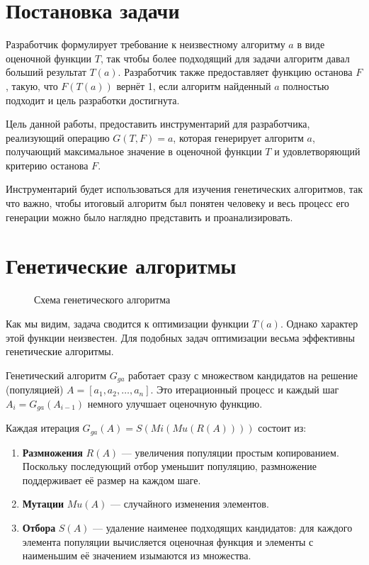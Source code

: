 \documentclass[utf8,a5paper,portrait,10pt,twoside]{eskdtext}
\begin{document}
\newpage
\section{Постановка задачи}
Разработчик формулирует требование к неизвестному алгоритму $a$ в виде оценочной
функции $T$, так чтобы более подходящий для задачи алгоритм давал больший
результат $T(a)$. Разработчик также предоставляет функцию останова $F$, такую,
что $F(T(a))$ вернёт 1, если алгоритм найденный $a$ полностью подходит и цель
разработки достигнута.

Цель данной работы, предоставить инструментарий для разработчика, реализующий
операцию $G(T, F) = a$, которая генерирует алгоритм $a$, получающий максимальное
значение в оценочной функции $T$ и удовлетворяющий критерию останова $F$.

Инструментарий будет использоваться для изучения генетических алгоритмов, так
что важно, чтобы итоговый алгоритм был понятен человеку и весь процесс его
генерации можно было наглядно представить и проанализировать.

\newpage
\section{Генетические алгоритмы}

\begin{figure}
  \centering
  
  \caption{Схема генетического алгоритма}
\end{figure}

Как мы видим, задача сводится к оптимизации функции $T(a)$. Однако характер этой
функции неизвестен. Для подобных задач оптимизации весьма эффективны
генетические алгоритмы.\cite{reinforcement}

Генетический алгоритм $G_{ga}$ работает сразу с множеством кандидатов на решение
(популяцией) $A = [a_1, a_2, …, a_n]$. Это итерационный процесс и каждый шаг
$A_i = G_{ga}(A_{i-1})$ немного улучшает оценочную функцию.

Каждая итерация $G_{ga}(A) = S(Mi(Mu(R(A))))$ состоит из:\cite{reinforcement}
\begin{enumerate}
  \item \textbf{Размножения} $R(A)$ — увеличения популяции простым копированием.
        Поскольку последующий отбор уменьшит популяцию, размножение поддерживает
        её размер на каждом шаге.
  \item \textbf{Мутации} $Mu(A)$ — случайного изменения элементов.
  \item \textbf{Отбора} $S(A)$ — удаление наименее подходящих кандидатов: для 
        каждого элемента популяции вычисляется оценочная функция и элементы с
        наименьшим её значением изымаются из множества.
\end{enumerate}
\end{document}
